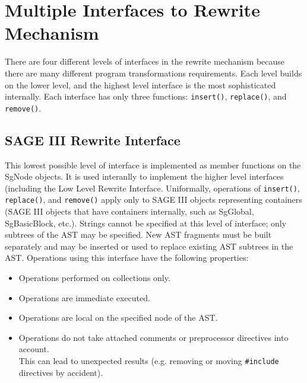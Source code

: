 \section{Multiple Interfaces to Rewrite Mechanism}

   There are four different levels of interfaces in the rewrite mechanism
because there are many different program transformations requirements.  Each level
builds on the lower level, and the highest level interface is the most sophisticated 
internally. Each interface has only three functions: {\tt insert()}, {\tt replace()}, 
and {\tt remove()}.

\subsection{SAGE III Rewrite Interface}
   This lowest possible level of interface is implemented as member functions on the
SgNode objects. It is used interanlly to implement the higher level interfaces (including
the Low Level Rewrite Interface.  Uniformally,
operations of {\tt insert()}, {\tt replace()}, and {\tt remove()} apply only to SAGE III 
objects representing containers (SAGE III objects that have containers internally, 
such as SgGlobal, SgBasicBlock, etc.).  Strings cannot be specified at this level of
interface; only subtrees of the AST may be specified.  New AST fragments must be
built separately and may be inserted or used to replace existing AST subtrees in the AST.
Operations using this interface have the following properties:
\begin{itemize}
   \item Operations performed on collections only.
   \item Operations are immediate executed.
   \item Operations are local on the specified node of the AST.
   \item Operations do not take attached comments or preprocessor directives into account. \\
    This can lead to unexpected results (e.g. removing or moving {\tt \#include} directives
    by accident).
\end{itemize}

